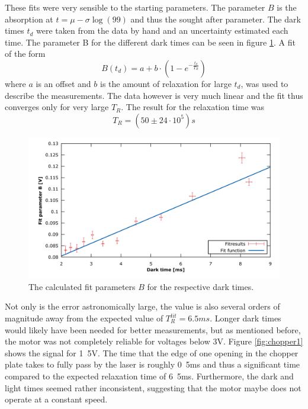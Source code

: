 These fits were very sensible to the starting parameters. The parameter $B$ is the absorption at $t=\mu-\sigma\log(99)$ and thus the sought after parameter. The dark times $t_d$ were taken from the data by hand and an uncertainty estimated each time. The parameter B for the different dark times can be seen in figure \ref{fig:Bparfit}. A fit of the form
\begin{equation}
B(t_d)=a+b\cdot(1-e^{-\frac{t_d}{T_R}})
\end{equation} 
where $a$ is an offset and $b$ is the amount of relaxation for large $t_d$, was used to describe the measurements. The data however is very much linear and the fit thus converges only for very large $T_R$. The result for the relaxation time was
\begin{equation}
T_R=\unit{(50\pm24\cdot10^5)}{s}
\end{equation}

\begin{figure}
	\centering
	\includegraphics[width=1.0\linewidth]{graphics/Bparfit}
	\caption[Relaxation time fit Franzen]{The calculated fit parameters $B$ for the respective dark times.}
	\label{fig:Bparfit}
\end{figure}

Not only is the error astronomically large, the value is also several orders of magnitude away from the expected value of $T_R^{lit}=\unit{6.5}{ms}$. Longer dark times would likely have been needed for better measurements, but as mentioned before, the motor was not completely reliable for voltages below \unit{3}{V}. Figure \ref{fig:chopper1} shows the signal for \unit{1.5}{V}. The time that the edge of one opening in the chopper plate takes to fully pass by the laser is roughly \unit{0.5}{ms} and thus a significant time compared to the expected relaxation time of \unit{6.5}{ms}. Furthermore, the dark and light times seemed rather inconsistent, suggesting that the motor maybe does not operate at a constant speed. 

